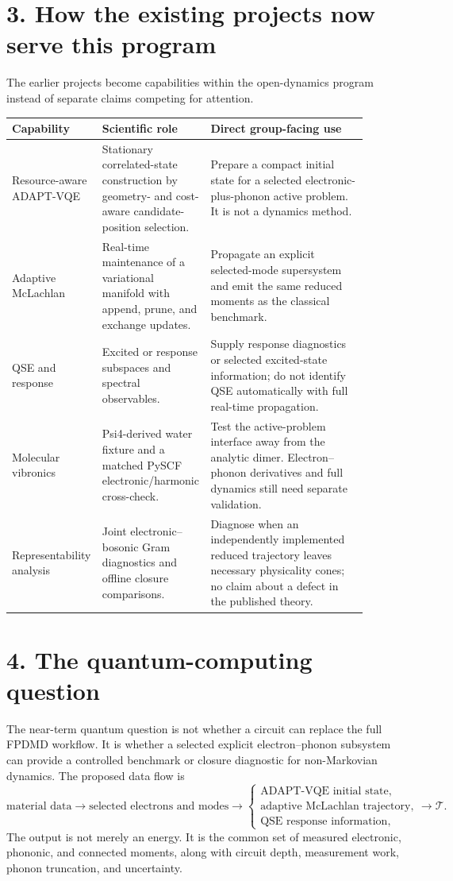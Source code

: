 \documentclass[11pt]{article}
\begin{document}
\section*{3. How the existing projects now serve this program}

The earlier projects become capabilities within the open-dynamics program
instead of separate claims competing for attention.

\begin{tabular}{p{0.17\linewidth}p{0.28\linewidth}p{0.44\linewidth}}
\toprule
Capability & Scientific role & Direct group-facing use \\
\midrule
Resource-aware ADAPT-VQE & Stationary correlated-state construction by
geometry- and cost-aware candidate-position selection. & Prepare a compact
initial state for a selected electronic-plus-phonon active problem. It is not a
dynamics method. \\
\addlinespace
Adaptive McLachlan & Real-time maintenance of a variational manifold with
append, prune, and exchange updates. & Propagate an explicit selected-mode
supersystem and emit the same reduced moments as the classical benchmark. \\
\addlinespace
QSE and response & Excited or response subspaces and spectral observables. &
Supply response diagnostics or selected excited-state information; do not
identify QSE automatically with full real-time propagation. \\
\addlinespace
Molecular vibronics & Psi4-derived water fixture and a matched PySCF
electronic/harmonic cross-check. & Test the active-problem interface away from
the analytic dimer. Electron--phonon derivatives and full dynamics still need
separate validation. \\
\addlinespace
Representability analysis & Joint electronic--bosonic Gram diagnostics and
offline closure comparisons. & Diagnose when an independently implemented
reduced trajectory leaves necessary physicality cones; no claim about a defect
in the published theory. \\
\bottomrule
\end{tabular}

\section*{4. The quantum-computing question}

The near-term quantum question is not whether a circuit can replace the full
FPDMD workflow. It is whether a selected explicit electron--phonon subsystem
can provide a controlled benchmark or closure diagnostic for non-Markovian
dynamics. The proposed data flow is
\[
\text{material data}
\longrightarrow \text{selected electrons and modes}
\longrightarrow
\begin{cases}
\text{ADAPT-VQE initial state},\\
\text{adaptive McLachlan trajectory},\\
\text{QSE response information},
\end{cases}
\longrightarrow \mathcal T.
\]
The output is not merely an energy. It is the common set of measured
electronic, phononic, and connected moments, along with circuit depth,
measurement work, phonon truncation, and uncertainty.
\end{document}
